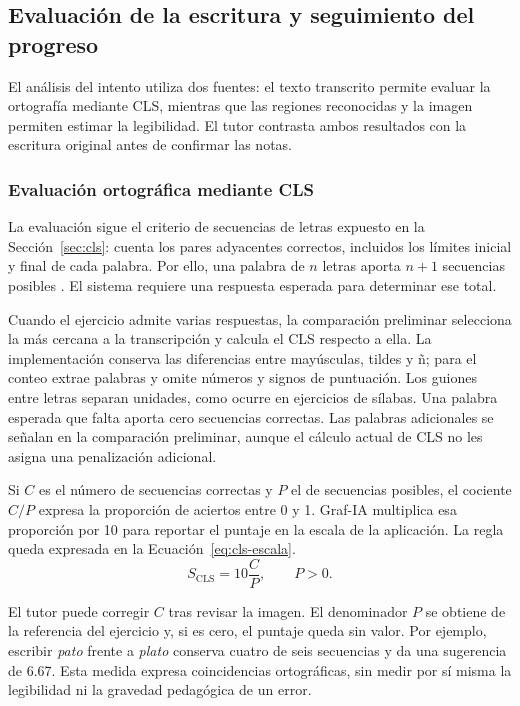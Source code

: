 \subsection{Evaluación de la escritura y seguimiento del progreso}
\label{sec:analisis-evaluacion}

El análisis del intento utiliza dos fuentes: el texto transcrito permite evaluar la ortografía mediante CLS, mientras que las regiones reconocidas y la imagen permiten estimar la legibilidad. El tutor contrasta ambos resultados con la escritura original antes de confirmar las notas.

\subsubsection{Evaluación ortográfica mediante CLS}

La evaluación sigue el criterio de secuencias de letras expuesto en la Sección~\ref{sec:cls}: cuenta los pares adyacentes correctos, incluidos los límites inicial y final de cada palabra. Por ello, una palabra de $n$ letras aporta $n+1$ secuencias posibles \cite{treiman2016measures, aimswebplus2025manual}. El sistema requiere una respuesta esperada para determinar ese total.

Cuando el ejercicio admite varias respuestas, la comparación preliminar selecciona la más cercana a la transcripción y calcula el CLS respecto a ella. La implementación conserva las diferencias entre mayúsculas, tildes y ñ; para el conteo extrae palabras y omite números y signos de puntuación. Los guiones entre letras separan unidades, como ocurre en ejercicios de sílabas. Una palabra esperada que falta aporta cero secuencias correctas. Las palabras adicionales se señalan en la comparación preliminar, aunque el cálculo actual de CLS no les asigna una penalización adicional.

\begin{samepage}
Si $C$ es el número de secuencias correctas y $P$ el de secuencias posibles, el cociente $C/P$ expresa la proporción de aciertos entre 0 y 1. Graf-IA multiplica esa proporción por 10 para reportar el puntaje en la escala de la aplicación. La regla queda expresada en la Ecuación~\eqref{eq:cls-escala}.
\begin{equation}
    S_{\mathrm{CLS}} = 10\frac{C}{P}, \qquad P>0.
    \label{eq:cls-escala}
\end{equation}
\end{samepage}
El tutor puede corregir $C$ tras revisar la imagen. El denominador $P$ se obtiene de la referencia del ejercicio y, si es cero, el puntaje queda sin valor. Por ejemplo, escribir \textit{pato} frente a \textit{plato} conserva cuatro de seis secuencias y da una sugerencia de 6.67. Esta medida expresa coincidencias ortográficas, sin medir por sí misma la legibilidad ni la gravedad pedagógica de un error.

